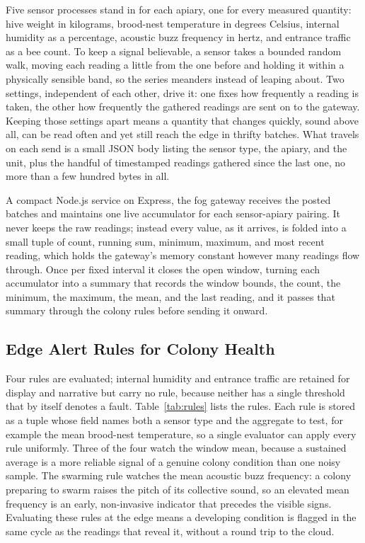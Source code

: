 \documentclass[conference]{IEEEtran}
\begin{document}
Five sensor processes stand in for each apiary, one for every measured quantity: hive weight in kilograms, brood-nest temperature in degrees Celsius, internal humidity as a percentage, acoustic buzz frequency in hertz, and entrance traffic as a bee count. To keep a signal believable, a sensor takes a bounded random walk, moving each reading a little from the one before and holding it within a physically sensible band, so the series meanders instead of leaping about. Two settings, independent of each other, drive it: one fixes how frequently a reading is taken, the other how frequently the gathered readings are sent on to the gateway. Keeping those settings apart means a quantity that changes quickly, sound above all, can be read often and yet still reach the edge in thrifty batches. What travels on each send is a small JSON body listing the sensor type, the apiary, and the unit, plus the handful of timestamped readings gathered since the last one, no more than a few hundred bytes in all.

A compact Node.js service on Express, the fog gateway receives the posted batches and maintains one live accumulator for each sensor-apiary pairing. It never keeps the raw readings; instead every value, as it arrives, is folded into a small tuple of count, running sum, minimum, maximum, and most recent reading, which holds the gateway's memory constant however many readings flow through. Once per fixed interval it closes the open window, turning each accumulator into a summary that records the window bounds, the count, the minimum, the maximum, the mean, and the last reading, and it passes that summary through the colony rules before sending it onward.

\subsection{Edge Alert Rules for Colony Health}

Four rules are evaluated; internal humidity and entrance traffic are retained for display and narrative but carry no rule, because neither has a single threshold that by itself denotes a fault. Table~\ref{tab:rules} lists the rules. Each rule is stored as a tuple whose field names both a sensor type and the aggregate to test, for example the mean brood-nest temperature, so a single evaluator can apply every rule uniformly. Three of the four watch the window mean, because a sustained average is a more reliable signal of a genuine colony condition than one noisy sample. The swarming rule watches the mean acoustic buzz frequency: a colony preparing to swarm raises the pitch of its collective sound, so an elevated mean frequency is an early, non-invasive indicator that precedes the visible signs. Evaluating these rules at the edge means a developing condition is flagged in the same cycle as the readings that reveal it, without a round trip to the cloud.
\end{document}
